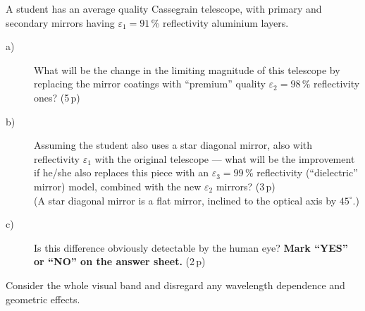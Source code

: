 A student has an average quality Cassegrain telescope, with primary and
secondary mirrors having $\varepsilon_1 = 91$\,\% reflectivity aluminium
layers.

\begin{description}
\item[a)] What will be the change in the limiting magnitude of this telescope
  by replacing the mirror coatings with ``premium'' quality
  $\varepsilon_2 = 98$\,\% reflectivity ones? \hfill(5\,p)
\item[b)] Assuming the student also uses a star diagonal mirror, also with
  reflectivity $\varepsilon_1$ with the original telescope --- what will be the
  improvement if he/she also replaces this piece with an
  $\varepsilon_3 = 99$\,\% reflectivity (``dielectric'' mirror) model, combined
  with the new $\varepsilon_2$ mirrors? \hfill(3\,p)\\
  (A star diagonal mirror is a flat mirror, inclined to the optical axis by
  $45^\circ$.)
\item[c)] Is this difference obviously detectable by the human eye? \textbf{
  Mark ``YES'' or ``NO'' on the answer sheet.} \hfill(2\,p)
\end{description}

Consider the whole visual band and disregard any wavelength dependence and
geometric effects.
